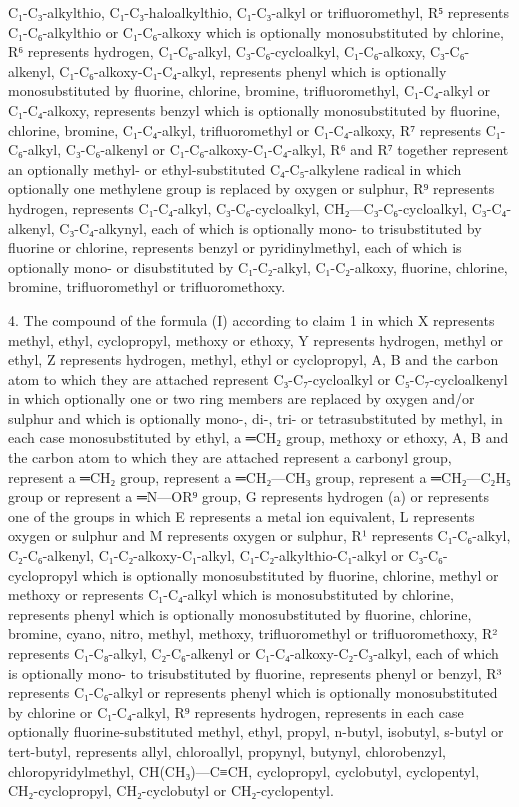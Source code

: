 \documentclass[11pt,a4paper]{article}
\begin{document}
C₁-C₃-alkylthio, C₁-C₃-haloalkylthio, C₁-C₃-alkyl or trifluoromethyl, R⁵ represents C₁-C₆-alkylthio or C₁-C₆-alkoxy which is optionally monosubstituted by chlorine, R⁶ represents hydrogen, C₁-C₆-alkyl, C₃-C₆-cycloalkyl, C₁-C₆-alkoxy, C₃-C₆-alkenyl, C₁-C₆-alkoxy-C₁-C₄-alkyl, represents phenyl which is optionally monosubstituted by fluorine, chlorine, bromine, trifluoromethyl, C₁-C₄-alkyl or C₁-C₄-alkoxy, represents benzyl which is optionally monosubstituted by fluorine, chlorine, bromine, C₁-C₄-alkyl, trifluoromethyl or C₁-C₄-alkoxy, R⁷ represents C₁-C₆-alkyl, C₃-C₆-alkenyl or C₁-C₆-alkoxy-C₁-C₄-alkyl, R⁶ and R⁷ together represent an optionally methyl- or ethyl-substituted C₄-C₅-alkylene radical in which optionally one methylene group is replaced by oxygen or sulphur, R⁹ represents hydrogen, represents C₁-C₄-alkyl, C₃-C₆-cycloalkyl, CH₂—C₃-C₆-cycloalkyl, C₃-C₄-alkenyl, C₃-C₄-alkynyl, each of which is optionally mono- to trisubstituted by fluorine or chlorine, represents benzyl or pyridinylmethyl, each of which is optionally mono- or disubstituted by C₁-C₂-alkyl, C₁-C₂-alkoxy, fluorine, chlorine, bromine, trifluoromethyl or trifluoromethoxy.

4. The compound of the formula (I) according to claim 1 in which X represents methyl, ethyl, cyclopropyl, methoxy or ethoxy, Y represents hydrogen, methyl or ethyl, Z represents hydrogen, methyl, ethyl or cyclopropyl, A, B and the carbon atom to which they are attached represent C₃-C₇-cycloalkyl or C₅-C₇-cycloalkenyl in which optionally one or two ring members are replaced by oxygen and/or sulphur and which is optionally mono-, di-, tri- or tetrasubstituted by methyl, in each case monosubstituted by ethyl, a ═CH₂ group, methoxy or ethoxy, A, B and the carbon atom to which they are attached represent a carbonyl group, represent a ═CH₂ group, represent a ═CH₂—CH₃ group, represent a ═CH₂—C₂H₅ group or represent a ═N—OR⁹ group, G represents hydrogen (a) or represents one of the groups in which E represents a metal ion equivalent, L represents oxygen or sulphur and M represents oxygen or sulphur, R¹ represents C₁-C₆-alkyl, C₂-C₆-alkenyl, C₁-C₂-alkoxy-C₁-alkyl, C₁-C₂-alkylthio-C₁-alkyl or C₃-C₆-cyclopropyl which is optionally monosubstituted by fluorine, chlorine, methyl or methoxy or represents C₁-C₄-alkyl which is monosubstituted by chlorine, represents phenyl which is optionally monosubstituted by fluorine, chlorine, bromine, cyano, nitro, methyl, methoxy, trifluoromethyl or trifluoromethoxy, R² represents C₁-C₈-alkyl, C₂-C₆-alkenyl or C₁-C₄-alkoxy-C₂-C₃-alkyl, each of which is optionally mono- to trisubstituted by fluorine, represents phenyl or benzyl, R³ represents C₁-C₆-alkyl or represents phenyl which is optionally monosubstituted by chlorine or C₁-C₄-alkyl, R⁹ represents hydrogen, represents in each case optionally fluorine-substituted methyl, ethyl, propyl, n-butyl, isobutyl, s-butyl or tert-butyl, represents allyl, chloroallyl, propynyl, butynyl, chlorobenzyl, chloropyridylmethyl, CH(CH₃)—C≡CH, cyclopropyl, cyclobutyl, cyclopentyl, CH₂-cyclopropyl, CH₂-cyclobutyl or CH₂-cyclopentyl.
\end{document}
